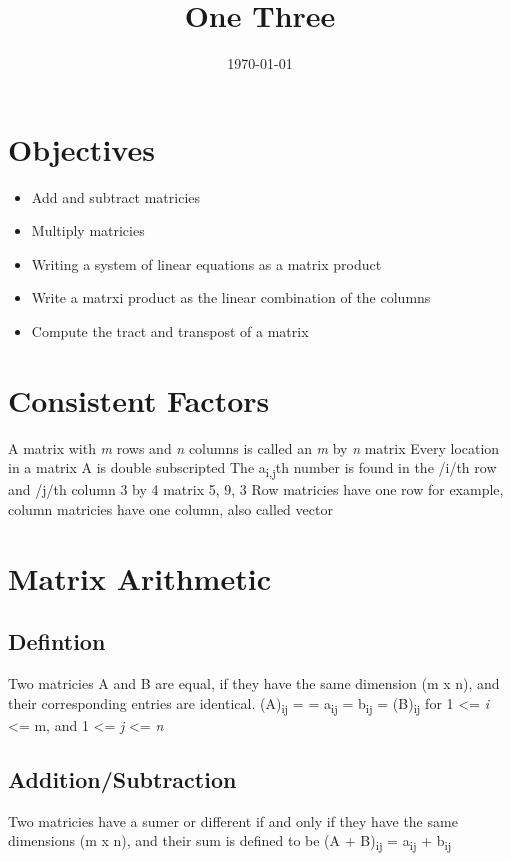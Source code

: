 \documentclass[11pt]{article}
\date{\today}
\title{One Three}
\begin{document}
\maketitle
\tableofcontents

\section{Objectives}
\label{sec:orge602a99}
\begin{itemize}
\item Add and subtract matricies
\item Multiply matricies
\item Writing a system of linear equations as a matrix product
\item Write a matrxi product as the linear combination of the columns
\item Compute the tract and transpost of a matrix
\end{itemize}
\section{Consistent Factors}
\label{sec:org2d65353}
A matrix with \emph{m} rows and \emph{n} columns is called an \emph{m} by \emph{n} matrix
Every location in a matrix A is double subscripted
The a\textsubscript{i,j}th number is found in the /i/th row and /j/th column
3 by 4 matrix
5, 9, 3
Row matricies have one row for example, column matricies have one column, also called vector
\section{Matrix Arithmetic}
\label{sec:org5039691}
\subsection{Defintion}
\label{sec:orgfaa89d4}
Two matricies A and B are equal, if they have the same dimension (m x n), and their corresponding entries are identical. (A)\textsubscript{ij} = = a\textsubscript{ij} = b\textsubscript{ij} = (B)\textsubscript{ij} for 1 <= \emph{i} <= m, and 1 <= \emph{j} <= \emph{n}
\subsection{Addition/Subtraction}
\label{sec:org4606370}
Two matricies have a sumer or different if and only if they have the same dimensions (m x n), and their sum is defined to be (A + B)\textsubscript{ij} = a\textsubscript{ij} + b\textsubscript{ij}
\end{document}

